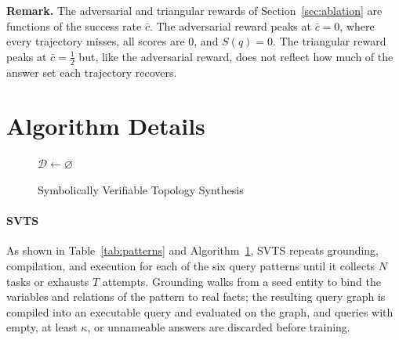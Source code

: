 \textbf{Remark.} The adversarial and triangular rewards of Section~\ref{sec:ablation} are functions of the success rate $\bar{c}$. The adversarial reward peaks at $\bar{c}=0$, where every trajectory misses, all scores are $0$, and $S(q)=0$. The triangular reward peaks at $\bar{c}=\tfrac12$ but, like the adversarial reward, does not reflect how much of the answer set each trajectory recovers.

\section{Algorithm Details}
\label{app:algorithm}


\begin{figure}[t]
\centering
\begin{minipage}[t]{\linewidth}
\makeatletter\@twocolumnfalse\makeatother %
\begin{algorithm}[H]
\SetAlgoLined
\DontPrintSemicolon
{}
$\mathcal{D}\leftarrow\varnothing$\;
\;
\caption{Symbolically Verifiable Topology Synthesis}
\label{alg:svts}
\end{algorithm}
\end{minipage}
\vspace{-2mm}
\end{figure}

\paragraph{SVTS}
As shown in Table~\ref{tab:patterns} and Algorithm~\ref{alg:svts}, SVTS repeats grounding, compilation, and execution for each of the six query patterns until it collects $N$ tasks or exhausts $T$ attempts. Grounding walks from a seed entity to bind the variables and relations of the pattern to real facts; the resulting query graph is compiled into an executable query and evaluated on the graph, and queries with empty, at least $\kappa$, or unnameable answers are discarded before training.

